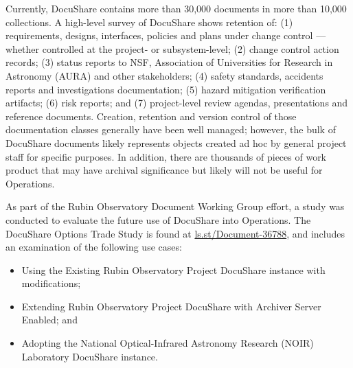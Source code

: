 Currently, DocuShare contains more than 30,000 documents in more than 10,000 collections.
A high-level survey of DocuShare shows retention of:
(1) requirements, designs, interfaces, policies and plans under change control --- whether controlled at the project- or subsystem-level;
(2) change control action records;
(3) status reports to NSF, Association of Universities for Research in Astronomy (AURA) and other stakeholders;
(4) safety standards, accidents reports and investigations documentation;
(5) hazard mitigation verification artifacts;
(6) risk reports; and
(7) project-level review agendas, presentations and reference documents.
Creation, retention and version control of those documentation classes generally have been well managed; however, the bulk of DocuShare documents likely represents objects created ad hoc by general project staff for specific purposes.
In addition, there are thousands of pieces of work product that may have archival significance but likely will not be useful for Operations.

As part of the Rubin Observatory Document Working Group effort, a study was conducted to evaluate the future use of DocuShare into Operations.
The DocuShare Options Trade Study  is found at \url{ls.st/Document-36788}, and includes an examination of the following use cases:

\begin{itemize}
	\item Using the Existing Rubin Observatory Project DocuShare instance with modifications;
	\item Extending Rubin Observatory Project DocuShare with Archiver Server Enabled; and
	\item Adopting the National Optical-Infrared Astronomy Research (NOIR) Laboratory DocuShare instance.
\end{itemize}
